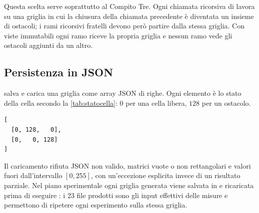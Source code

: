 Questa scelta serve soprattutto al Compito Tre. Ogni chiamata ricorsiva di
\cmin{} lavora su una griglia in cui la chiusura della chiamata precedente è
diventata un insieme di ostacoli; i rami ricorsivi fratelli devono però
partire dalla stessa griglia. Con viste immutabili ogni ramo riceve la propria
griglia e nessun ramo vede gli ostacoli aggiunti da un altro.

\subsection{Persistenza in JSON}

 salva e carica una griglia come array JSON di righe.
Ogni elemento è lo stato della cella secondo la \cref{tab:statocella}: $0$
per una cella libera, $128$ per un ostacolo.

\begin{lstlisting}
[
  [0, 128,   0],
  [0,   0, 128]
]
\end{lstlisting}

Il caricamento rifiuta JSON non valido, matrici vuote o non rettangolari e
valori fuori dall'intervallo $[0,255]$, con un'eccezione esplicita invece di
un risultato parziale. Nel piano sperimentale ogni griglia generata viene
salvata in  e ricaricata prima di eseguire
\cmin{}: i 23 file prodotti sono gli input effettivi delle misure e
permettono di ripetere ogni esperimento sulla stessa griglia.
